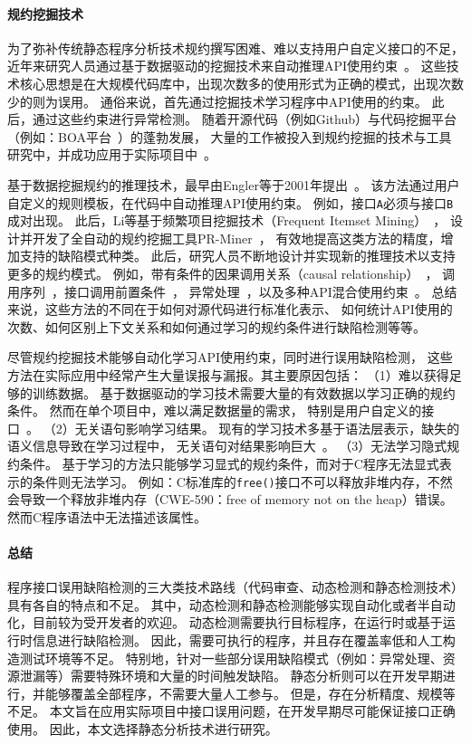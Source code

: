 \paragraph{规约挖掘技术}
为了弥补传统静态程序分析技术规约撰写困难、难以支持用户自定义接口的不足，
近年来研究人员通过基于数据驱动的挖掘技术来自动推理API使用约束~\cite{13survey}。
这些技术核心思想是在大规模代码库中，出现次数多的使用形式为正确的模式，出现次数少的则为误用。
通俗来说，首先通过挖掘技术学习程序中API使用的约束。
此后，通过这些约束进行异常检测。
随着开源代码（例如Github）与代码挖掘平台（例如：BOA平台~\cite{15-tosem-boa}）的蓬勃发展，
大量的工作被投入到规约挖掘的技术与工具研究中，并成功应用于实际项目中~\cite{survey18}。

基于数据挖掘规约的推理技术，最早由Engler等于2001年提出~\cite{01-sosp-mining}。
该方法通过用户自定义的规则模板，在代码中自动推理API使用约束。
例如，接口\texttt{A}必须与接口\texttt{B}成对出现。
此后，Li等基于频繁项目挖掘技术（Frequent Itemset Mining）~\cite{03-fimi-frequent}，
设计并开发了全自动的规约挖掘工具PR-Miner~\cite{05-fse-prminer}，
有效地提高这类方法的精度，增加支持的缺陷模式种类。
此后，研究人员不断地设计并实现新的推理技术以支持更多的规约模式。
例如，带有条件的因果调用关系（causal relationship）~\cite{07-fse-temporal}，
调用序列~\cite{09-ase-sequence}，接口调用前置条件~\cite{14-fse-pre}，
异常处理~\cite{16-ase-apex}，以及多种API混合使用约束~\cite{16-sec-apisan}。
总结来说，这些方法的不同在于如何对源代码进行标准化表示、
如何统计API使用的次数、如何区别上下文关系和如何通过学习的规约条件进行缺陷检测等等。

尽管规约挖掘技术能够自动化学习API使用约束，同时进行误用缺陷检测，
这些方法在实际应用中经常产生大量误报与漏报。其主要原因包括：
（1）难以获得足够的训练数据。
基于数据驱动的学习技术需要大量的有效数据以学习正确的规约条件。
然而在单个项目中，难以满足数据量的需求，
特别是用户自定义的接口~\cite{15-kernel-sv,survey18}。
（2）无关语句影响学习结果。
现有的学习技术多基于语法层表示，缺失的语义信息导致在学习过程中，
无关语句对结果影响巨大~\cite{16-icse-antminer}。
（3）无法学习隐式规约条件。
基于学习的方法只能够学习显式的规约条件，而对于C程序无法显式表示的条件则无法学习。
例如：C标准库的\texttt{free()}接口不可以释放非堆内存，不然会导致一个释放非堆内存（CWE-590：free of memory not on the heap）错误。
然而C程序语法中无法描述该属性。

\paragraph{总结}
程序接口误用缺陷检测的三大类技术路线（代码审查、动态检测和静态检测技术）具有各自的特点和不足。
其中，动态检测和静态检测能够实现自动化或者半自动化，目前较为受开发者的欢迎。
动态检测需要执行目标程序，在运行时或基于运行时信息进行缺陷检测。
因此，需要可执行的程序，并且存在覆盖率低和人工构造测试环境等不足。
特别地，针对一些部分误用缺陷模式（例如：异常处理、资源泄漏等）需要特殊环境和大量的时间触发缺陷。
静态分析则可以在开发早期进行，并能够覆盖全部程序，不需要大量人工参与。
但是，存在分析精度、规模等不足。
本文旨在应用实际项目中接口误用问题，在开发早期尽可能保证接口正确使用。
因此，本文选择静态分析技术进行研究。



